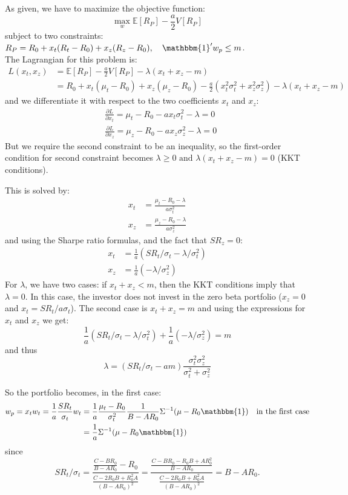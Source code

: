 \documentclass[10pt]{article}
\newcommand{\Ebb}{\mathbb{E}}
\newenvironment{exercise}[2][Exercise]{\begin{trivlist}
  \item[\hskip \labelsep {\bfseries #1}\hskip \labelsep {\bfseries #2.}]}{\end{trivlist}}
\begin{document}
\begin{exercise}{1}
\begin{itemize}
    As given, we have to maximize the objective function: $$ \max_w \Ebb[R_P] - \frac{a}{2}V[R_P]$$ subject to two constraints: $R_P = R_0 + x_t(R_t - R_0)  + x_z(R_z-R_0), \quad \mathbbm{1}'w_p \leq m$. 
    \\
    The Lagrangian for this problem is: \begin{align*}
      L(x_t,x_z) &= \Ebb[R_P] - \frac{a}{2}V[R_P] - \lambda(x_t+x_z -m)\\
      &= R_0 +x_t(\mu_t-R_0) + x_z(\mu_z-R_0) - \frac{a}{2}(x_t^2\sigma_t^2+x_z^2\sigma_z^2) - \lambda(x_t+x_z-m)
    \end{align*} and we differentiate it with respect to the two coefficients $x_t$ and $x_z$: 
    \begin{align*}
      &\frac{\partial L}{\partial x_t} = \mu_t-R_0 -ax_t\sigma_t^2-\lambda = 0\\
      &\frac{\partial L}{\partial x_z} = \mu_z-R_0 -ax_z\sigma_z^2-\lambda = 0
    \end{align*}
    But we require the second constraint to be an inequality, so the first-order condition for second constraint becomes $ \lambda\geq 0 \text{ and } \lambda(x_t+x_z-m) = 0$ (KKT conditions). 

    This is solved by: 
    \begin{align*}
      x_t &= \frac{\mu_t -R_0 -\lambda}{a\sigma_t^2}\\
      x_z &= \frac{\mu_z -R_0 -\lambda}{a\sigma_z^2}
    \end{align*} and using the Sharpe ratio formulas, and the fact that $SR_z = 0$:
    \begin{align*}
      x_t &= \frac{1}{a}(SR_t/\sigma_t - \lambda/\sigma_t^2)\\
      x_z &= \frac{1}{a}(-\lambda/\sigma_z^2)
    \end{align*}
    For $\lambda$, we have two cases: if $x_t+x_z < m$, then the KKT conditions imply that $\lambda = 0$. In this case, the investor does not invest in the zero beta portfolio ($x_z = 0$ and $x_t = SR_t/{a\sigma_t}$). The second case is $x_t+x_z = m$ and using the expressions for $x_t$ and $x_z$ we get:
    $$ \frac{1}{a}(SR_t/\sigma_t - \lambda/\sigma_t^2) + \frac{1}{a}(-\lambda/\sigma_z^2) = m$$
    and thus $$ \lambda = (SR_t/\sigma_t -am)\frac{\sigma_t^2\sigma_z^2}{\sigma_t^2+\sigma_z^2}$$

    So the portfolio becomes, in the first case: 
    \begin{align*}
      w_p = x_tw_t = \frac{1}{a}\frac{SR_t}{\sigma_t} w_t &= \frac{1}{a}\frac{\mu_t-R_0}{\sigma_t^2}\frac{1}{B-AR_0}\Sigma^{-1}(\mu-R_0\mathbbm{1}) \quad \text{in the first case} \\
      &= \frac{1}{a}\Sigma^{-1}(\mu-R_0\mathbbm{1})
    \end{align*} since $$SR_t/\sigma_t = \frac{\frac{C-BR_0}{B-AR_0}- R_0}{\frac{C-2R_0B+R_0^2A}{(B-AR_0)^2}} = \frac{\frac{C-BR_0-R_0B+AR_0^2}{B-AR_0}}{\frac{C-2R_0B+R_0^2A}{(B-AR_0)^2}} = B-AR_0.$$


\end{itemize}
\end{exercise}
\end{document}
